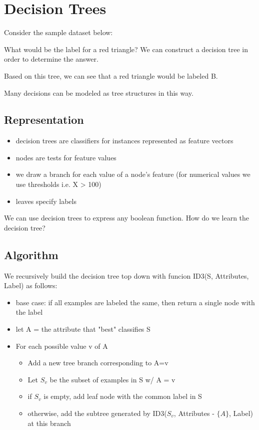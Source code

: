 \chapter{Decision Trees}

Consider the sample dataset below: 
\begin{center}
\end{center}
What would be the label for a red triangle? We can construct a decision tree in order to determine the answer. 
\begin{center}
\end{center}
Based on this tree, we can see that a red triangle would be labeled B.

Many decisions can be modeled as tree structures in this way.

\section{Representation}
\begin{itemize}
    \item decision trees are classifiers for instances represented as feature vectors
    \item nodes are tests for feature values 
    \item we draw a branch for each value of a node's feature (for numerical values we use thresholds i.e. X > 100)
    \item leaves specify labels
\end{itemize}

We can use decision trees to express any boolean function. How do we learn the decision tree?

\section{Algorithm}
We recursively build the decision tree top down with funcion ID3(S, Attributes, Label) as follows:
\begin{itemize}
    \item base case: if all examples are labeled the same, then return a single node with the label
    \item let A = the attribute that "best" classifies S
    \item For each possible value v of A
    \begin{itemize}
        \item Add a new tree branch corresponding to A=v
        \item Let $S_v$ be the subset of examples in S w/ A = v
        \item if $S_v$ is empty, add leaf node with the common label in S
        \item otherwise, add the subtree generated by ID3($S_v$, Attributes - $\{A\}$, Label) at this branch
    \end{itemize}
\end{itemize}

